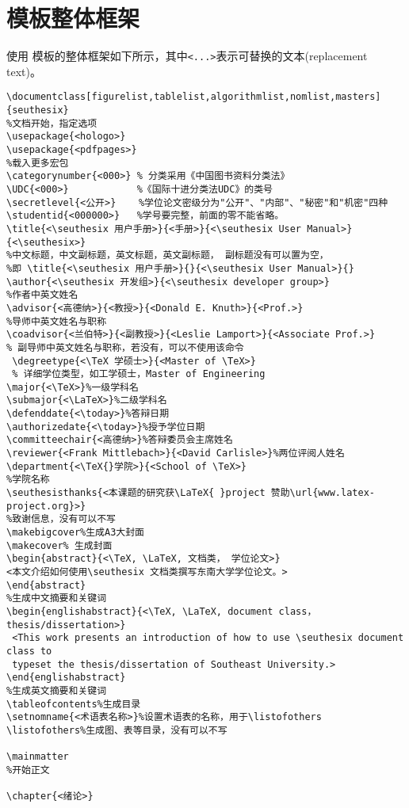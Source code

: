 ﻿\documentclass[figurelist,tablelist,algorithmlist,nomlist,masters]{seuthesix}
\begin{document}
\section{模板整体框架}
使用 \seuthesix 模板的整体框架如下所示，其中\verb+<...>+表示可替换的文本(replacement text)。
{\color{magenta}
\begin{verbatim}
\documentclass[figurelist,tablelist,algorithmlist,nomlist,masters]{seuthesix}
%文档开始，指定选项
\usepackage{<hologo>}
\usepackage{<pdfpages>}
%载入更多宏包
\categorynumber{<000>} % 分类采用《中国图书资料分类法》
\UDC{<000>}            %《国际十进分类法UDC》的类号
\secretlevel{<公开>}    %学位论文密级分为"公开"、"内部"、"秘密"和"机密"四种
\studentid{<000000>}   %学号要完整，前面的零不能省略。
\title{<\seuthesix 用户手册>}{<手册>}{<\seuthesix User Manual>}{<\seuthesix>}
%中文标题，中文副标题，英文标题，英文副标题， 副标题没有可以置为空， 
%即 \title{<\seuthesix 用户手册>}{}{<\seuthesix User Manual>}{}
\author{<\seuthesix 开发组>}{<\seuthesix developer group>}
%作者中英文姓名
\advisor{<高德纳>}{<教授>}{<Donald E. Knuth>}{<Prof.>}
%导师中英文姓名与职称
\coadvisor{<兰伯特>}{<副教授>}{<Leslie Lamport>}{<Associate Prof.>} 
% 副导师中英文姓名与职称，若没有，可以不使用该命令
 \degreetype{<\TeX 学硕士>}{<Master of \TeX>} 
 % 详细学位类型，如工学硕士，Master of Engineering
\major{<\TeX>}%一级学科名
\submajor{<\LaTeX>}%二级学科名
\defenddate{<\today>}%答辩日期
\authorizedate{<\today>}%授予学位日期
\committeechair{<高德纳>}%答辩委员会主席姓名
\reviewer{<Frank Mittlebach>}{<David Carlisle>}%两位评阅人姓名
\department{<\TeX{}学院>}{<School of \TeX>}
%学院名称
\seuthesisthanks{<本课题的研究获\LaTeX{ }project 赞助\url{www.latex-project.org}>}
%致谢信息，没有可以不写
\makebigcover%生成A3大封面
\makecover% 生成封面
\begin{abstract}{<\TeX, \LaTeX, 文档类， 学位论文>}
<本文介绍如何使用\seuthesix 文档类撰写东南大学学位论文。>
\end{abstract}
%生成中文摘要和关键词
\begin{englishabstract}{<\TeX, \LaTeX, document class， thesis/dissertation>}
 <This work presents an introduction of how to use \seuthesix document class to 
 typeset the thesis/dissertation of Southeast University.>
\end{englishabstract}
%生成英文摘要和关键词
\tableofcontents%生成目录
\setnomname{<术语表名称>}%设置术语表的名称，用于\listofothers
\listofothers%生成图、表等目录，没有可以不写

\mainmatter
%开始正文

\chapter{<绪论>}

\end{verbatim}}
\end{document}

